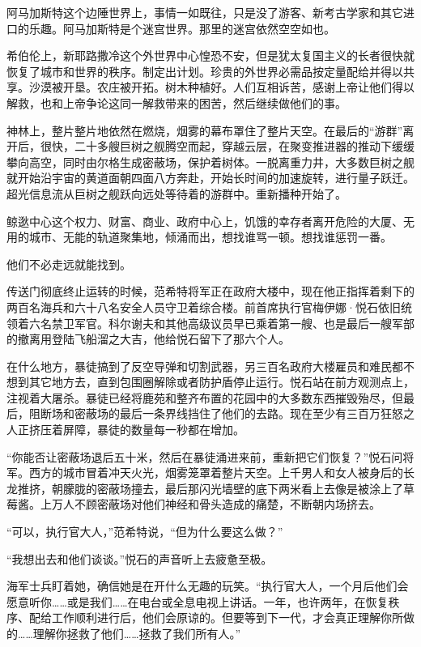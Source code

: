 \documentclass[AutoFakeBold=true]{book}
\begin{document}
阿马加斯特这个边陲世界上，事情一如既往，只是没了游客、新考古学家和其它进口的乐趣。阿马加斯特是个迷宫世界。那里的迷宫依然空空如也。

希伯伦上，新耶路撒冷这个外世界中心惶恐不安，但是犹太复国主义的长者很快就恢复了城市和世界的秩序。制定出计划。珍贵的外世界必需品按定量配给并得以共享。沙漠被开垦。农庄被开拓。树木种植好。人们互相诉苦，感谢上帝让他们得以解救，也和上帝争论这同一解救带来的困苦，然后继续做他们的事。

神林上，整片整片地依然在燃烧，烟雾的幕布罩住了整片天空。在最后的``游群''离开后，很快，二十多艘巨树之舰腾空而起，穿越云层，在聚变推进器的推动下缓缓攀向高空，同时由尔格生成密蔽场，保护着树体。一脱离重力井，大多数巨树之舰就开始沿宇宙的黄道面朝四面八方奔赴，开始长时间的加速旋转，进行量子跃迁。超光信息流从巨树之舰跃向远处等待着的游群中。重新播种开始了。

鲸逖中心这个权力、财富、商业、政府中心上，饥饿的幸存者离开危险的大厦、无用的城市、无能的轨道聚集地，倾涌而出，想找谁骂一顿。想找谁惩罚一番。

他们不必走远就能找到。

\vspace*{1em}

传送门彻底终止运转的时候，范希特将军正在政府大楼中，现在他正指挥着剩下的两百名海兵和六十八名安全人员守卫着综合楼。前首席执行官梅伊娜·悦石依旧统领着六名禁卫军官。科尔谢夫和其他高级议员早已乘着第一艘、也是最后一艘军部的撤离用登陆飞船溜之大吉，他给悦石留下了那六个人。

在什么地方，暴徒搞到了反空导弹和切割武器，另三百名政府大楼雇员和难民都不想到其它地方去，直到包围圈解除或者防护盾停止运行。悦石站在前方观测点上，注视着大屠杀。暴徒已经将鹿苑和整齐布置的花园中的大多数东西摧毁殆尽，但最后，阻断场和密蔽场的最后一条界线挡住了他们的去路。现在至少有三百万狂怒之人正挤压着屏障，暴徒的数量每一秒都在增加。

``你能否让密蔽场退后五十米，然后在暴徒涌进来前，重新把它们恢复？''悦石问将军。西方的城市冒着冲天火光，烟雾笼罩着整片天空。上千男人和女人被身后的长龙推挤，朝朦胧的密蔽场撞去，最后那闪光墙壁的底下两米看上去像是被涂上了草莓酱。上万人不顾密蔽场对他们神经和骨头造成的痛楚，不断朝内场挤去。

``可以，执行官大人，''范希特说，``但为什么要这么做？''

``我想出去和他们谈谈。''悦石的声音听上去疲惫至极。

海军士兵盯着她，确信她是在开什么无趣的玩笑。``执行官大人，一个月后他们会愿意听你……或是我们……在电台或全息电视上讲话。一年，也许两年，在恢复秩序、配给工作顺利进行后，他们会原谅的。但要等到下一代，才会真正理解你所做的……理解你拯救了他们……拯救了我们所有人。''
\end{document}
